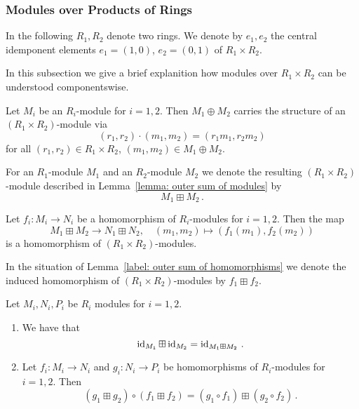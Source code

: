 \subsubsection{Modules over Products of Rings}


\begin{conventions}
  In the following $R_1, R_2$ denote two rings.
  We denote by $e_1, e_2$ the central idemponent elements $e_1 = (1,0)$, $e_2 = (0,1)$ of $R_1 \times R_2$.
\end{conventions}


\begin{fluff}
  In this subsection we give a brief explanition how modules over $R_1 \times R_2$ can be understood componentswise.
\end{fluff}


\begin{lemma}
  \label{lemma: outer sum of modules}
  Let $M_i$ be an $R_i$-module for $i = 1, 2$.
  Then $M_1 \oplus M_2$ carries the structure of an $(R_1 \times R_2)$-module via
  \[
      (r_1, r_2) \cdot (m_1, m_2)
    = (r_1 m_1, r_2 m_2)
  \]
  for all $(r_1, r_2) \in R_1 \times R_2$, $(m_1, m_2) \in M_1 \oplus M_2$.
\end{lemma}


\begin{definition}
  For an $R_1$-module $M_1$ and an $R_2$-module $M_2$ we denote the resulting $(R_1 \times R_2)$-module described in Lemma~\ref{lemma: outer sum of modules} by
  \[
    M_1 \boxplus M_2 \,.
  \]
\end{definition}


\begin{lemma}
  \label{label: outer sum of homomorphisms}
  Let $f_i \colon M_i \to N_i$ be a homomorphism of $R_i$-modules for $i = 1, 2$.
  Then the map
  \[
            M_1 \boxplus M_2
    \to     N_1 \boxplus N_2,
    \quad   (m_1, m_2)
    \mapsto (f_1(m_1), f_2(m_2))
  \]
  is a homomorphism of $(R_1 \times R_2)$-modules.
\end{lemma}


\begin{definition}
  In the situation of Lemma~\ref{label: outer sum of homomorphisms} we denote the induced homomorphism of $(R_1 \times R_2)$-modules by $f_1 \boxplus f_2$.
\end{definition}


\begin{lemma}
  Let $M_i, N_i, P_i$ be $R_i$ modules for $i = 1, 2$.
  \begin{enumerate}
    \item
      We have that
      \[
          \operatorname{id}_{M_1} \boxplus \operatorname{id}_{M_2}
        = \operatorname{id}_{M_1 \boxplus M_2} \,.
      \]
    \item
      Let $f_i \colon M_i \to N_i$ and $g_i \colon N_i \to P_i$ be homomorphisms of $R_i$-modules for $i = 1, 2$.
      Then
      \[
          (g_1 \boxplus g_2) \circ (f_1 \boxplus f_2)
        = (g_1 \circ f_1) \boxplus (g_2 \circ f_2) \,.
      \]
  \end{enumerate}
\end{lemma}



